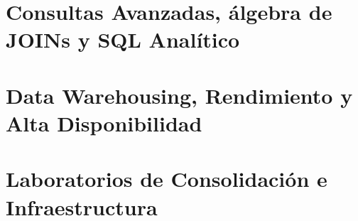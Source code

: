 \documentclass[11pt,a4paper,openany]{report}
\begin{document}
\part{Consultas Avanzadas, \'algebra de JOINs y SQL Anal\'itico}





\part{Data Warehousing, Rendimiento y Alta Disponibilidad}




\part{Laboratorios de Consolidaci\'on e Infraestructura}


\end{document}
